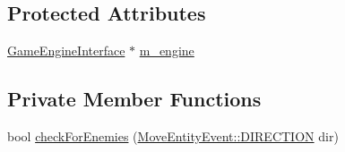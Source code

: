 \subsection*{Protected Attributes}
\begin{DoxyCompactItemize}
\item 
\hyperlink{classGameEngineInterface}{Game\-Engine\-Interface} $\ast$ \hyperlink{classGameSystemBase_aa9044eb22399f0c0ddd8f049738c62e5}{m\-\_\-engine}
\end{DoxyCompactItemize}
\subsection*{Private Member Functions}
\begin{DoxyCompactItemize}
\item 
bool \hyperlink{classCombatSystem_aa60d601edd993b6a7bded45d0e786595}{check\-For\-Enemies} (\hyperlink{classMoveEntityEvent_a7058a943643bee9164a21e62e3392807}{Move\-Entity\-Event\-::\-D\-I\-R\-E\-C\-T\-I\-O\-N} dir)
\end{DoxyCompactItemize}


